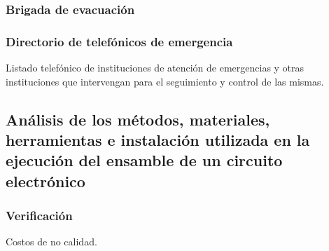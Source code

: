     \subsubsection{Brigada de evacuación}
    
    \subsubsection{Directorio de telefónicos de emergencia}
    
    Listado telefónico de instituciones de atención de emergencias y otras instituciones que intervengan para el seguimiento y control de las mismas.
    
    \subsection{Análisis de los métodos, materiales, herramientas e instalación utilizada en la ejecución del ensamble de un circuito electrónico}
    
    \subsubsection{Verificación}
    
    Costos de no calidad.
